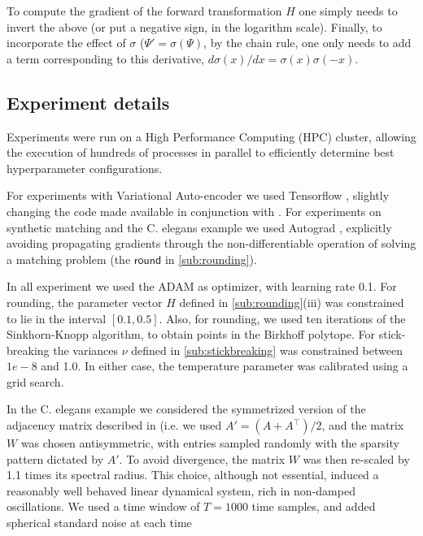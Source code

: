 \documentclass[twoside]{article}
\begin{document}
To compute the gradient of the forward transformation $H$ one simply needs to invert the above (or put a negative sign, in the logarithm scale). Finally,  to incorporate the effect of $\sigma$ ($\Psi'=\sigma(\Psi)$, by the chain rule,  one only needs to add a term corresponding to this derivative, $d\sigma(x)/dx=\sigma(x)\sigma(-x)$. 
\subsection*{Experiment details}

Experiments were run on a High Performance Computing (HPC) cluster, allowing the execution of hundreds of processes in parallel to efficiently determine best hyperparameter configurations.

For experiments with Variational Auto-encoder we used Tensorflow \citep{Abadi2016}, slightly changing the code made available in conjunction with \cite{Jang2016}. For experiments on synthetic matching and the C. elegans example we used Autograd  \citep{maclaurin2015autograd}, explicitly avoiding propagating gradients through the non-differentiable operation of solving a matching problem (the $\mathsf{round}$ in \ref{sub:rounding}).

In all experiment we used the ADAM as optimizer, with learning rate 0.1. For rounding, the parameter vector $H$ defined in \ref{sub:rounding}(iii) was constrained to lie in the interval $[0.1, 0.5]$. Also, for rounding, we used ten iterations of the Sinkhorn-Knopp algorithm, to obtain points in the Birkhoff polytope. For stick-breaking the variances $\nu$ defined in \ref{sub:stickbreaking} was constrained between $1e-8$ and 1.0. In either case, the temperature parameter was calibrated using a grid search.
 
In the C. elegans example we considered the symmetrized version of the adjacency matrix described in \citep{varshney2011structural} (i.e. we used $A'=(A+A^\top)/2$, and the matrix $W$ was chosen antisymmetric, with entries sampled randomly with the sparsity pattern dictated by $A'$. To avoid divergence, the matrix $W$ was then re-scaled by 1.1 times its spectral radius. This choice, although not essential, induced a reasonably well behaved linear dynamical system, rich in non-damped oscillations. We used a time window of $T=1000$ time samples, and added spherical standard noise at each time 
\end{document}
